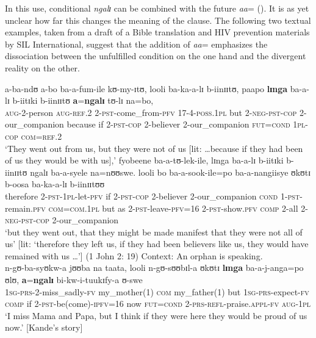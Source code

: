 In this use, conditional \textit{ngalɪ} can be combined with the future  \textit{aa}= (). It is as yet unclear how far this changes the meaning of the clause. The following two textual examples, taken from a draft of a Bible translation and HIV prevention materials by SIL International, suggest that the addition of \mbox{\textit{aa}=} emphasizes the dissociation between the unfulfilled condition on the one hand and the divergent reality on the other.
\begin{exe}
\ex \gll
a-ba-ndʊ a-bo ba-a-fum-ile kʊ-my-ɪtʊ, looli ba-ka-a-lɪ b-iinɪɪtʊ, paapo \textbf{lɪnga} ba-a-lɪ b-iitɪki b-iinɪɪtʊ \textbf{a}=\textbf{ngalɪ} tʊ-lɪ na=bo,\\
\textsc{aug}-2-person \textsc{aug}-\textsc{ref.2} 2-\textsc{pst}-come\_from-\textsc{pfv} 17-4-\textsc{poss.1pl} but 2-\textsc{neg}-\textsc{pst}-\textsc{cop} 2-our\_companion because if 2-\textsc{pst}-\textsc{cop} 2-believer 2-our\_companion \textsc{fut}=\textsc{cond} \textsc{1pl}-\textsc{cop} \textsc{com}=\textsc{ref.2}\\
\glt \lq They went out from us, but they were not of us [lit: \ldots because if they had been of us they would be with us],'
\sn \gll fyobeene ba-a-tʊ-lek-ile, lɪnga ba-a-lɪ b-iitɪki b-iinɪɪtʊ ngalɪ ba-a-syele na=nʊʊswe. looli bo ba-a-sook-ile=po ba-a-nangiisye ʊkʊtɪ b-oosa ba-ka-a-lɪ b-iinɪɪtʊʊ\\
therefore 2-\textsc{pst}-\textsc{1pl}-let-\textsc{pfv} if 2-\textsc{pst}-\textsc{cop} 2-believer 2-our\_companion \textsc{cond} 1-\textsc{pst}-remain.\textsc{pfv} \textsc{com}=\textsc{com.1pl} but as 2-\textsc{pst}-leave-\textsc{pfv}=16 2-\textsc{pst}-show.\textsc{pfv} \textsc{comp} 2-all 2-\textsc{neg}-\textsc{pst}-\textsc{cop} 2-our\_companion\\
\glt \lq  but they went out, that they might be made manifest that they were not all of us'  [lit: \lq therefore they left us, if they had been believers like us, they would have remained with us \ldots'] (1 John 2: 19)
\ex Context: An orphan is speaking.\\
\gll n-gʊ-ba-syʊkw-a jʊʊba na taata, looli n-gʊ-sʊʊbɪl-a ʊkʊtɪ \textbf{lɪnga} ba-a-j-anga=po ʊlʊ, \textbf{a}=\textbf{ngalɪ} bi-kw-i-tuukɪfy-a ʊ-swe\\
\textsc{1sg}-\textsc{prs}-2-miss\_sadly-\textsc{fv} my\_mother(1) \textsc{com} my\_father(1) but \textsc{1sg}-\textsc{prs}-expect-\textsc{fv} \textsc{comp} if 2-\textsc{pst}-be(come)-\textsc{ipfv}=16 now \textsc{fut}=\textsc{cond} 2-\textsc{prs}-\textsc{refl}-praise.\textsc{appl}-\textsc{fv} \textsc{aug}-\textsc{1pl}\\
\glt \lq I miss Mama and Papa, but I think if they were here they would be proud of us now.' [Kande's story]\footnotemark
\protect{}
\end{exe}


